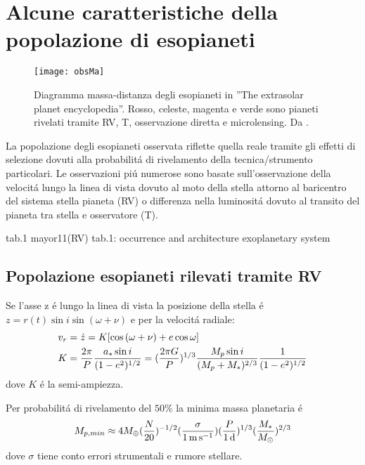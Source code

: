 {\let\clearpage\relax\let\cleardoublepage\relax
\chapter{Alcune caratteristiche della popolazione di esopianeti}
}

\begin{wrapfigure}[13]{l}{0.45\textwidth}
\texttt{[image: obsMa]}\label{fig:Maplot}
\caption{Diagramma massa-distanza degli esopianeti in ''The extrasolar planet encyclopedia''. Rosso, celeste, magenta e verde sono pianeti rivelati tramite RV, T, osservazione diretta e microlensing. Da \cite{mordasini2018}.}
\end{wrapfigure}

La popolazione degli esopianeti osservata riflette quella reale tramite gli effetti di selezione dovuti alla probabilit\'a di rivelamento della tecnica/strumento particolari. Le osservazioni pi\'u numerose sono basate sull'osservazione della velocit\'a lungo la linea di vista dovuto al moto della stella attorno al baricentro del sistema stella pianeta (RV) o differenza nella luminosit\'a dovuto al transito del pianeta tra stella e osservatore (T).

\begin{workout}
tab.1 mayor11(RV)
tab.1: occurrence and architecture exoplanetary system 
\end{workout}

\section{Popolazione esopianeti rilevati tramite RV}

Se l'asse z \'e lungo la linea di vista la posizione della stella \'e $z=r(t)\sin{i}\sin{(\omega+\nu)}$ e per la velocit\'a radiale:
\begin{align}
&v_r=\dot{z}=K[\cos{(\omega+\nu)}+e\cos{\omega}]\label{eq:vrsignal}\\
&K=\frac{2\pi}{P}\frac{a_*\sin{i}}{(1-e^2)^{1/2}}=(\frac{2\pi G}{P})^{1/3}\frac{M_p\sin{i}}{(M_p+M_*)^{2/3}}\frac{1}{(1-e^2)^{1/2}}
\end{align}
dove $K$ \'e la semi-ampiezza.

Per probabilit\'a di rivelamento del $50\%$ la minima massa planetaria \'e
\begin{equation}
M_{p,min}\approx4\mearth{}(\frac{N}{20})\expy{-1/2}(\frac{\sigma}{\SI{1}{\meter\per\second}})(\frac{P}{\SI{1}{\day}})\expy{1/3}(\frac{M_*}{\msun{}})\expy{2/3}
\end{equation}
dove $\sigma$ tiene conto errori strumentali e rumore stellare.

